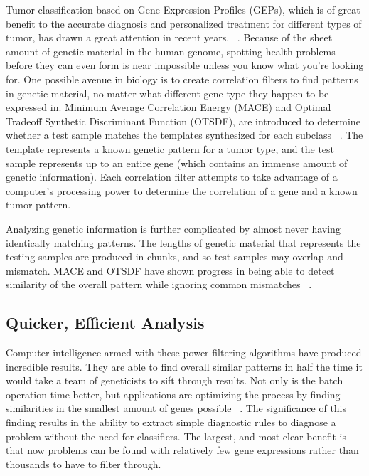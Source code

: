 \documentclass[11pt]{article}
\newcommand{\tab}{\hspace*{2em}}
\begin{document}
\begin{doublespace}
\tab Tumor classification based on Gene Expression Profiles (GEPs), which is of great benefit to the accurate diagnosis 
and personalized treatment for different types of tumor, has drawn a great attention in 
recent years. ~\cite{Wang:2012:RCM:2122263.2122454}. Because of the sheet amount of genetic material in the 
human genome, spotting health problems before they can even form is near impossible unless you know what you're looking
for. One possible avenue in biology is to create correlation filters to find patterns in genetic material, no matter what
different gene type they happen to be expressed in. Minimum Average Correlation Energy (MACE) and Optimal Tradeoff Synthetic
Discriminant Function (OTSDF), are introduced to determine whether a test sample matches the templates synthesized for 
each subclass ~\cite{Wang:2012:RCM:2122263.2122454}. The template represents a known genetic pattern for a tumor type, 
and the test sample represents up to an entire
gene (which contains an immense amount of genetic information). Each correlation filter attempts to take advantage of a
computer's processing power to determine the correlation of a gene and a known tumor pattern.

\tab Analyzing genetic information is further complicated by almost never having identically matching patterns. The lengths of 
genetic material that represents the testing samples are produced in chunks, and so test samples may overlap and mismatch. MACE
and OTSDF have shown progress in being able to detect similarity of the overall pattern while ignoring common mismatches
~\cite{Wang:2012:RCM:2122263.2122454}. 

\subsection{Quicker, Efficient Analysis}

\tab Computer intelligence armed with these power filtering algorithms have produced incredible results. They are able to find 
overall similar patterns in half the time it would take a team of geneticists to sift through results. Not only is the batch 
operation time better, but applications are optimizing the process by finding similarities in the smallest amount of genes 
possible ~\cite{Wang:2007:ACC:1229968.1229975}. The significance of this finding results in the ability to extract simple
diagnostic rules to diagnose a problem without the need for classifiers. The largest, and most clear benefit is that now
problems can be found with relatively few gene expressions rather than thousands to have to filter through. 


\end{doublespace}
\end{document}
